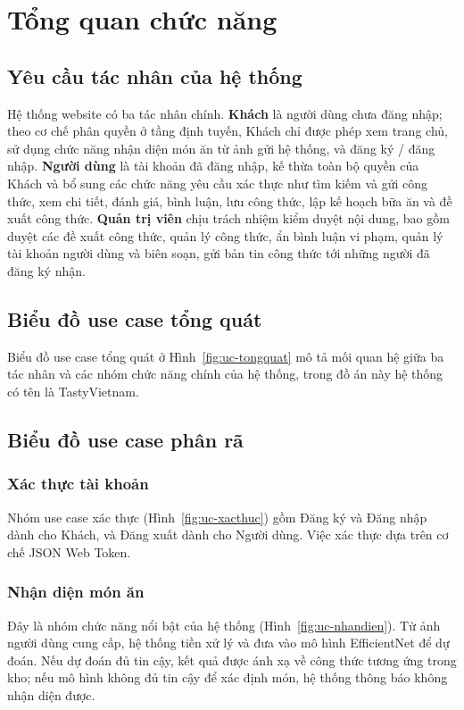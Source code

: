 \documentclass[../DoAn.tex]{subfiles}
\begin{document}
\section{Tổng quan chức năng}
\label{sec:2-tongquan}

\subsection{Yêu cầu tác nhân của hệ thống}
Hệ thống website có ba tác nhân chính. \textbf{Khách} là người dùng chưa đăng nhập; theo cơ chế phân quyền ở tầng định tuyến, Khách chỉ được phép xem trang chủ, sử dụng chức năng nhận diện món ăn từ ảnh gửi hệ thống, và đăng ký / đăng nhập. \textbf{Người dùng} là tài khoản đã đăng nhập, kế thừa toàn bộ quyền của Khách và bổ sung các chức năng yêu cầu xác thực như tìm kiếm và gửi công thức, xem chi tiết, đánh giá, bình luận, lưu công thức, lập kế hoạch bữa ăn và đề xuất công thức. \textbf{Quản trị viên} chịu trách nhiệm kiểm duyệt nội dung, bao gồm duyệt các đề xuất công thức, quản lý công thức, ẩn bình luận vi phạm, quản lý tài khoản người dùng và biên soạn, gửi bản tin công thức tới những người đã đăng ký nhận.

\subsection{Biểu đồ use case tổng quát}
Biểu đồ use case tổng quát ở Hình~\ref{fig:uc-tongquat} mô tả mối quan hệ giữa ba tác nhân và các nhóm chức năng chính của hệ thống, trong đồ án này hệ thống có tên là TastyVietnam.


\subsection{Biểu đồ use case phân rã}

\subsubsection{Xác thực tài khoản}
Nhóm use case xác thực (Hình~\ref{fig:uc-xacthuc}) gồm Đăng ký và Đăng nhập dành cho Khách, và Đăng xuất dành cho Người dùng. Việc xác thực dựa trên cơ chế JSON Web Token.


\subsubsection{Nhận diện món ăn}
Đây là nhóm chức năng nổi bật của hệ thống (Hình~\ref{fig:uc-nhandien}). Từ ảnh người dùng cung cấp, hệ thống tiền xử lý và đưa vào mô hình EfficientNet để dự đoán. Nếu dự đoán đủ tin cậy, kết quả được ánh xạ về công thức tương ứng trong kho; nếu mô hình không đủ tin cậy để xác định món, hệ thống thông báo không nhận diện được.
\end{document}
